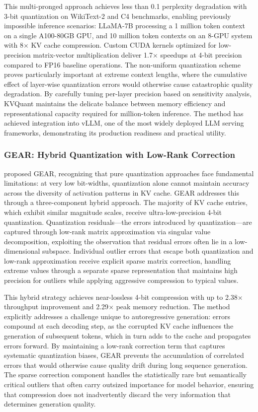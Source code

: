 This multi-pronged approach achieves less than 0.1 perplexity degradation with 3-bit quantization on WikiText-2 and C4 benchmarks, enabling previously impossible inference scenarios: LLaMA-7B processing a 1 million token context on a single A100-80GB GPU, and 10 million token contexts on an 8-GPU system with 8$\times$ KV cache compression. Custom CUDA kernels optimized for low-precision matrix-vector multiplication deliver 1.7$\times$ speedups at 4-bit precision compared to FP16 baseline operations. The non-uniform quantization scheme proves particularly important at extreme context lengths, where the cumulative effect of layer-wise quantization errors would otherwise cause catastrophic quality degradation. By carefully tuning per-layer precision based on sensitivity analysis, KVQuant maintains the delicate balance between memory efficiency and representational capacity required for million-token inference. The method has achieved integration into vLLM, one of the most widely deployed LLM serving frameworks, demonstrating its production readiness and practical utility.

\subsubsection{GEAR: Hybrid Quantization with Low-Rank Correction}

\citet{kang2024gear} proposed GEAR, recognizing that pure quantization approaches face fundamental limitations: at very low bit-widths, quantization alone cannot maintain accuracy across the diversity of activation patterns in KV cache. GEAR addresses this through a three-component hybrid approach. The majority of KV cache entries, which exhibit similar magnitude scales, receive ultra-low-precision 4-bit quantization. Quantization residuals---the errors introduced by quantization---are captured through low-rank matrix approximation via singular value decomposition, exploiting the observation that residual errors often lie in a low-dimensional subspace. Individual outlier errors that escape both quantization and low-rank approximation receive explicit sparse matrix correction, handling extreme values through a separate sparse representation that maintains high precision for outliers while applying aggressive compression to typical values.

This hybrid strategy achieves near-lossless 4-bit compression with up to 2.38$\times$ throughput improvement and 2.29$\times$ peak memory reduction. The method explicitly addresses a challenge unique to autoregressive generation: errors compound at each decoding step, as the corrupted KV cache influences the generation of subsequent tokens, which in turn adds to the cache and propagates errors forward. By maintaining a low-rank correction term that captures systematic quantization biases, GEAR prevents the accumulation of correlated errors that would otherwise cause quality drift during long sequence generation. The sparse correction component handles the statistically rare but semantically critical outliers that often carry outsized importance for model behavior, ensuring that compression does not inadvertently discard the very information that determines generation quality.

